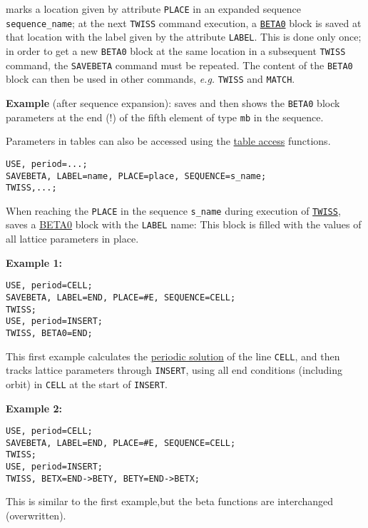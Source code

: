 marks a location given by attribute \texttt{PLACE} in an expanded
sequence \texttt{sequence\_name}; at the next \texttt{TWISS} command
execution, a \hyperref[sec:beta0]{\texttt{BETA0}} block is saved at that
location with the label given by the attribute \texttt{LABEL}. This is
done only once; in order to get a new \texttt{BETA0} block at the same
location in a subsequent \texttt{TWISS} command, the \texttt{SAVEBETA}
command  must be repeated. The content of the \texttt{BETA0} block can
then be used in other commands, \textsl{e.g.} \texttt{TWISS} and
\texttt{MATCH}. 

\textbf{Example} (after sequence expansion): 
saves and then shows the \texttt{BETA0} block parameters at the end (!) of the
fifth element of type \texttt{mb} in the sequence.  


Parameters in tables can also be accessed 
using the \hyperref[chap:tables]{table access} functions. 
\begin{verbatim}
USE, period=...;
SAVEBETA, LABEL=name, PLACE=place, SEQUENCE=s_name;
TWISS,...;
\end{verbatim}

When reaching the \texttt{PLACE} in the
sequence \texttt{s\_name} during execution of
\hyperref[chap:twiss]{\texttt{TWISS}}, \madx saves a
\hyperref[sec:beta0]{BETA0} block with the \texttt{LABEL} name: This
block is filled with the values of all lattice parameters in place.   

\textbf{Example 1:} 
\begin{verbatim}
USE, period=CELL;
SAVEBETA, LABEL=END, PLACE=#E, SEQUENCE=CELL;
TWISS;
USE, period=INSERT;
TWISS, BETA0=END;
\end{verbatim}
This first example calculates the \hyperref[sec:twissperiod]{periodic
  solution} of the line \texttt{CELL}, and then tracks lattice parameters through
\texttt{INSERT}, using all end conditions (including orbit) in
\texttt{CELL} at the start of \texttt{INSERT}.  

\textbf{Example 2:} 
\begin{verbatim}
USE, period=CELL;
SAVEBETA, LABEL=END, PLACE=#E, SEQUENCE=CELL;
TWISS;
USE, period=INSERT;
TWISS, BETX=END->BETY, BETY=END->BETX;
\end{verbatim}
This is similar to the first example,but the beta functions are interchanged (overwritten).  


